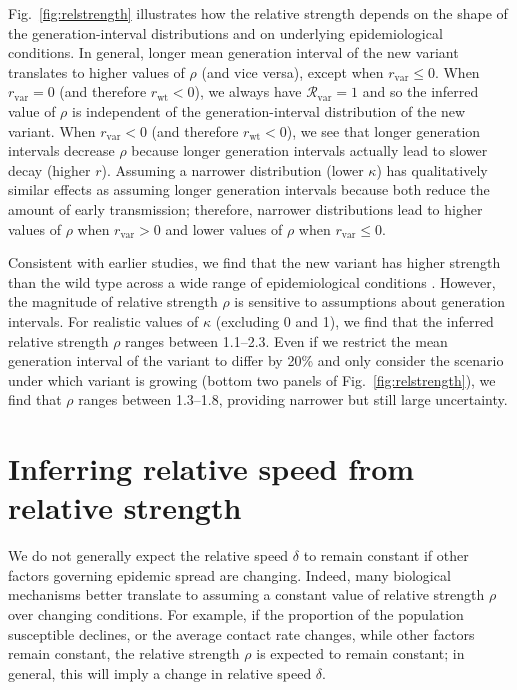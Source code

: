 \documentclass[12pt]{article}
\newcommand{\fref}[1]{Fig.~\ref{fig:#1}}
\newcommand{\vvvar}{\mathrm{var}}
\newcommand{\wwwt}{\mathrm{wt}}
\newcommand{\rx}[1]{\ensuremath{{r}_{#1}}\xspace}
\newcommand{\rw}{\rx{\wwwt}}
\newcommand{\rv}{\rx{\vvvar}}
\newcommand{\Rx}[1]{\ensuremath{{\mathcal R}_{#1}}\xspace}
\newcommand{\Rv}{\Rx{\vvvar}}
\begin{document}
\fref{relstrength} illustrates how the relative strength depends on the shape of the generation-interval distributions and on underlying epidemiological conditions.
In general, longer mean generation interval of the new variant translates to higher values of $\rho$ (and vice versa), except when $\rv \leq 0$.
When $\rv = 0$ (and therefore $\rw < 0$), we always have $\Rv = 1$ and so the inferred value of $\rho$ is independent of the generation-interval distribution of the new variant.
When $\rv < 0$ (and therefore $\rw < 0$), we see that longer generation intervals decrease $\rho$ because longer generation intervals actually lead to slower decay (higher $r$).
Assuming a narrower distribution (lower $\kappa$) has qualitatively similar effects as assuming longer generation intervals because both reduce the amount of early transmission; 
therefore, narrower distributions lead to higher values of $\rho$ when $\rv > 0$ and lower values of $\rho$ when $\rv \leq 0$.

Consistent with earlier studies, we find that the new variant has higher strength than the wild type across a wide range of epidemiological conditions \citep{switzerland2021variant, davies2021estimated, di2021impact, leung2021early, volz2021transmission,zhao2021}.
However, the magnitude of relative strength $\rho$ is sensitive to assumptions about generation intervals.
For realistic values of $\kappa$ (excluding 0 and 1), we find that the inferred relative strength $\rho$ ranges between 1.1--2.3.
Even if we restrict the mean generation interval of the variant to differ by 20\% and only consider the scenario under which variant is growing (bottom two panels of \fref{relstrength}), we find that $\rho$ ranges between 1.3--1.8, providing narrower but still large uncertainty.

\section{Inferring relative speed from relative strength}

We do not generally expect the relative speed $\delta$ to remain constant if other factors governing epidemic spread are changing.
Indeed, many biological mechanisms better translate to assuming a constant value of relative strength $\rho$ over changing conditions.
For example, if the proportion of the population susceptible declines, or the average contact rate changes, while other factors remain constant, the relative strength $\rho$ is expected to remain constant; 
in general, this will imply a change in relative speed $\delta$.
\end{document}
